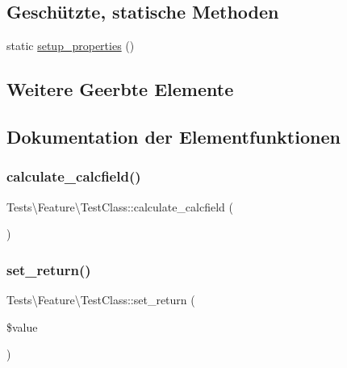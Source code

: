 \subsection*{Geschützte, statische Methoden}
\begin{DoxyCompactItemize}
\item 
static \hyperlink{classTests_1_1Feature_1_1TestClass_a4f40cde1a379681920a6be782eacb92c}{setup\+\_\+properties} ()
\end{DoxyCompactItemize}
\subsection*{Weitere Geerbte Elemente}


\subsection{Dokumentation der Elementfunktionen}
\mbox{\label{classTests_1_1Feature_1_1TestClass_a10b491ad8c6dab798f94c1cdfc2fd0c0}} 
\subsubsection{\texorpdfstring{calculate\+\_\+calcfield()}{calculate\_calcfield()}}
{\footnotesize\ttfamily Tests\textbackslash{}\+Feature\textbackslash{}\+Test\+Class\+::calculate\+\_\+calcfield (\begin{DoxyParamCaption}{ }\end{DoxyParamCaption})}

\mbox{\label{classTests_1_1Feature_1_1TestClass_a7026939606d37e762ecf5670b60ed620}} 
\subsubsection{\texorpdfstring{set\+\_\+return()}{set\_return()}}
{\footnotesize\ttfamily Tests\textbackslash{}\+Feature\textbackslash{}\+Test\+Class\+::set\+\_\+return (\begin{DoxyParamCaption}\item[{}]{\$value }\end{DoxyParamCaption})}

